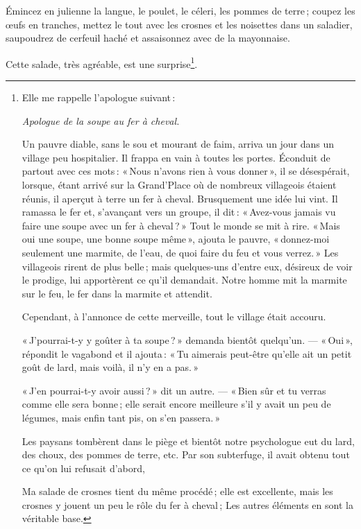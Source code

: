 Émincez en julienne la langue, le poulet, le céleri, les pommes de terre ;
coupez les œufs en tranches, mettez le tout avec les crosnes et les noisettes
dans un saladier, saupoudrez de cerfeuil haché et assaisonnez avec de la
mayonnaise.

Cette salade, très agréable, est une surprise\footnote{
Elle me rappelle
l'apologue suivant :
                \protect\endgraf

\begin{center}
\textit{Apologue de la soupe au fer à cheval.}
\end{center}
                \protect\endgraf

Un pauvre diable, sans le sou et mourant de faim, arriva un jour dans un
village peu hospitalier. Il frappa en vain à toutes les portes. Éconduit de
partout avec ces mots : « Nous n'avons rien à vous donner », il se désespérait,
lorsque, étant arrivé sur la Grand'Place où de nombreux villageois étaient
réunis, il aperçut à terre un fer à cheval. Brusquement une idée lui vint. Il
ramassa le fer et, s'avançant vers un groupe, il dit : « Avez-vous jamais vu
faire une soupe avec un fer à cheval ? » Tout le monde se mit à rire. « Mais
oui une soupe, une bonne soupe même », ajouta le pauvre, « donnez-moi seulement
une marmite, de l'eau, de quoi faire du feu et vous verrez. » Les villageois
rirent de plus belle ; mais quelques-uns d'entre eux, désireux de voir le
prodige, lui apportèrent ce qu'il demandait. Notre homme mit la marmite sur le
feu, le fer dans la marmite et attendit.
                \protect\endgraf

Cependant, à l'annonce de cette merveille, tout le village était accouru.
                \protect\endgraf

« J'pourrai-t-y y goûter à ta soupe ? » demanda bientôt quelqu'un. — « Oui »,
répondit le vagabond et il ajouta : « Tu aimerais peut-être qu'elle ait un
petit goût de lard, mais voilà, il n'y en a pas. »
                \protect\endgraf

« J'en pourrai-t-y avoir aussi ? » dit un autre. — « Bien sûr et tu verras
comme elle sera bonne ; elle serait encore meilleure s'il y avait un peu de
légumes, mais enfin tant pis, on s'en passera. »
                \protect\endgraf

Les paysans tombèrent dans le piège et bientôt notre psychologue eut du lard,
des choux, des pommes de terre, etc. Par son subterfuge, il avait obtenu tout
ce qu'on lui refusait d'abord,
                \protect\endgraf

Ma salade de crosnes tient du même procédé ; elle est excellente, mais les
crosnes y jouent un peu le rôle du fer à cheval ; Les autres éléments en sont
la véritable base.}.

